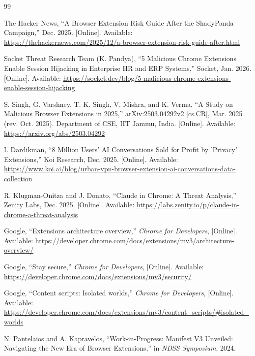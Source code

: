 \documentclass[12pt,oneside]{report}
\begin{document}
\endgroup
\begin{thebibliography}{99}

The Hacker News, 
``A Browser Extension Risk Guide After the ShadyPanda Campaign,'' 
Dec. 2025. 
[Online]. Available: \url{https://thehackernews.com/2025/12/a-browser-extension-risk-guide-after.html}

Socket Threat Research Team (K. Pandya), 
``5 Malicious Chrome Extensions Enable Session Hijacking in Enterprise HR and ERP Systems,'' 
Socket, Jan. 2026. 
[Online]. Available: \url{https://socket.dev/blog/5-malicious-chrome-extensions-enable-session-hijacking}

S. Singh, G. Varshney, T. K. Singh, V. Mishra, and K. Verma, 
``A Study on Malicious Browser Extensions in 2025,'' 
arXiv:2503.04292v2 [cs.CR], Mar. 2025 (rev. Oct. 2025).
Department of CSE, IIT Jammu, India.
[Online]. Available: \url{https://arxiv.org/abs/2503.04292}

I. Dardikman, 
``8 Million Users' AI Conversations Sold for Profit by 'Privacy' Extensions,'' 
Koi Research, Dec. 2025. 
[Online]. Available: \url{https://www.koi.ai/blog/urban-vpn-browser-extension-ai-conversations-data-collection}

R. Klugman-Onitza and J. Donato, 
``Claude in Chrome: A Threat Analysis,'' 
Zenity Labs, Dec. 2025. 
[Online]. Available: \url{https://labs.zenity.io/p/claude-in-chrome-a-threat-analysis}

Google, 
``Extensions architecture overview,'' 
\textit{Chrome for Developers}, 
[Online]. Available: \url{https://developer.chrome.com/docs/extensions/mv3/architecture-overview/}

Google, 
``Stay secure,'' 
\textit{Chrome for Developers}, 
[Online]. Available: \url{https://developer.chrome.com/docs/extensions/mv3/security/}

Google, 
``Content scripts: Isolated worlds,'' 
\textit{Chrome for Developers}, 
[Online]. Available: 
\url{https://developer.chrome.com/docs/extensions/mv3/content_scripts/#isolated_worlds}

N. Pantelaios and A. Kapravelos, 
``Work-in-Progress: Manifest V3 Unveiled: Navigating the New Era of Browser Extensions,'' 
in \textit{NDSS Symposium}, 2024.


\end{thebibliography}
\end{document}
